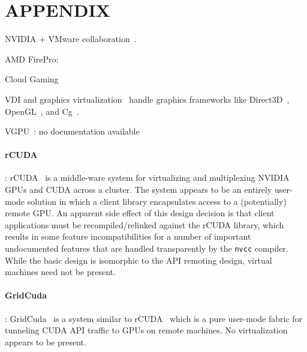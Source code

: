 \vfill\eject
\section*{APPENDIX}
\label{sec:appendix}

\begin{compactitem}
\item NVIDIA + VMware collaboration~\cite{grid}.
\item AMD FirePro:~\cite{firepro}
\item Cloud Gaming
\item VDI and graphics virtualization~\cite{vmware-virtual-gpu, VGML} handle
	graphics frameworks like Direct3D~\cite{directX}, OpenGL~\cite{openGLspec}, and Cg~\cite{mark03cg}.
\item VGPU~\cite{VGPU}: no documentation available
\end{compactitem}



\paragraph {\bf rCUDA}: rCUDA~\cite{rCUDA, rCUDAnew} is a middle-ware system for virtualizing and multiplexing
	NVIDIA GPUs and CUDA across a cluster. The system appears to be an entirely user-mode solution in which
	a client library encapsulates access to a (potentially) remote GPU. An apparent side effect of this design
	decision is that client applications must be recompiled/relinked against the rCUDA library, which results
	in some feature incompatibilities for a number of important undocumented features that are handled transparently
	by the {\tt nvcc} compiler. While the basic design is isomorphic to the API remoting design, virtual machines
	need not be present.

\paragraph {\bf GridCuda}: GridCuda~\cite{GridCuda} is a system similar to rCUDA~\cite{rCUDA} which is a pure
	user-mode fabric for tunneling CUDA API traffic to GPUs on remote machines. No virtualization appears to be present.

